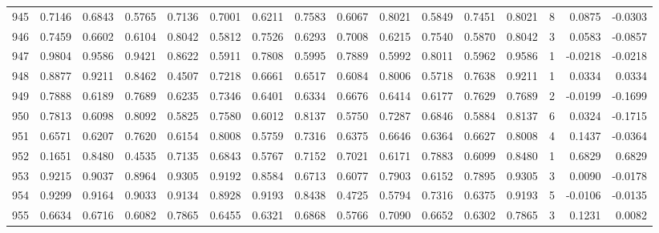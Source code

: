 \begin{tabular}{lrrrrrrrrrrrrrrr}
945 &      0.7146 &  0.6843 &  0.5765 &  0.7136 &  0.7001 &  0.6211 &  0.7583 &  0.6067 &  0.8021 &  0.5849 &   0.7451 &     0.8021 &      8 &                    0.0875 &                    -0.0303 \\
946 &      0.7459 &  0.6602 &  0.6104 &  0.8042 &  0.5812 &  0.7526 &  0.6293 &  0.7008 &  0.6215 &  0.7540 &   0.5870 &     0.8042 &      3 &                    0.0583 &                    -0.0857 \\
947 &      0.9804 &  0.9586 &  0.9421 &  0.8622 &  0.5911 &  0.7808 &  0.5995 &  0.7889 &  0.5992 &  0.8011 &   0.5962 &     0.9586 &      1 &                   -0.0218 &                    -0.0218 \\
948 &      0.8877 &  0.9211 &  0.8462 &  0.4507 &  0.7218 &  0.6661 &  0.6517 &  0.6084 &  0.8006 &  0.5718 &   0.7638 &     0.9211 &      1 &                    0.0334 &                     0.0334 \\
949 &      0.7888 &  0.6189 &  0.7689 &  0.6235 &  0.7346 &  0.6401 &  0.6334 &  0.6676 &  0.6414 &  0.6177 &   0.7629 &     0.7689 &      2 &                   -0.0199 &                    -0.1699 \\
950 &      0.7813 &  0.6098 &  0.8092 &  0.5825 &  0.7580 &  0.6012 &  0.8137 &  0.5750 &  0.7287 &  0.6846 &   0.5884 &     0.8137 &      6 &                    0.0324 &                    -0.1715 \\
951 &      0.6571 &  0.6207 &  0.7620 &  0.6154 &  0.8008 &  0.5759 &  0.7316 &  0.6375 &  0.6646 &  0.6364 &   0.6627 &     0.8008 &      4 &                    0.1437 &                    -0.0364 \\
952 &      0.1651 &  0.8480 &  0.4535 &  0.7135 &  0.6843 &  0.5767 &  0.7152 &  0.7021 &  0.6171 &  0.7883 &   0.6099 &     0.8480 &      1 &                    0.6829 &                     0.6829 \\
953 &      0.9215 &  0.9037 &  0.8964 &  0.9305 &  0.9192 &  0.8584 &  0.6713 &  0.6077 &  0.7903 &  0.6152 &   0.7895 &     0.9305 &      3 &                    0.0090 &                    -0.0178 \\
954 &      0.9299 &  0.9164 &  0.9033 &  0.9134 &  0.8928 &  0.9193 &  0.8438 &  0.4725 &  0.5794 &  0.7316 &   0.6375 &     0.9193 &      5 &                   -0.0106 &                    -0.0135 \\
955 &      0.6634 &  0.6716 &  0.6082 &  0.7865 &  0.6455 &  0.6321 &  0.6868 &  0.5766 &  0.7090 &  0.6652 &   0.6302 &     0.7865 &      3 &                    0.1231 &                     0.0082 \\

\end{tabular}
